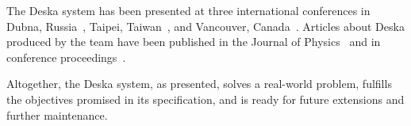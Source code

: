 \documentclass[deska]{subfiles}
\begin{document}
The Deska system has been presented at three international conferences in Dubna, Russia~\cite{dubna-kundrat}, Taipei,
Taiwan~\cite{chep-2010-deska}, and Vancouver, Canada~\cite{hepix-2011-deska}.  Articles about Deska produced by the team
have been published in the Journal of Physics~\cite{jop-deska} and in conference
proceedings~\cite{dubna-deska-proceedings}.

Altogether, the Deska system, as presented, solves a real-world problem, fulfills the objectives promised in its
specification, and is ready for future extensions and further maintenance.
\end{document}
